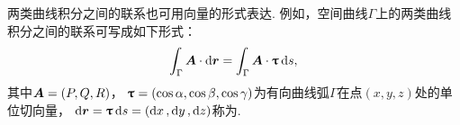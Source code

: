 两类曲线积分之间的联系也可用向量的形式表达.
例如，空间曲线\(\Gamma\)上的两类曲线积分之间的联系可写成如下形式：
\begin{equation}\label{equation:线积分与面积分.空间曲线上两类曲线积分之间的联系的向量形式}
	\int_\Gamma{\boldsymbol{A} \cdot \dd{\boldsymbol{r}}}
	= \int_\Gamma{\boldsymbol{A} \cdot \boldsymbol{\uptau} \dd{s}},
\end{equation}
其中\(\boldsymbol{A}=(P,Q,R)\)，
\(\boldsymbol{\uptau}=(\cos\alpha,\cos\beta,\cos\gamma)\)为有向曲线弧\(\Gamma\)在点\((x,y,z)\)处的单位切向量，
\(\dd{\boldsymbol{r}}
=\boldsymbol{\uptau}\dd{s}
=(\dd{x},\dd{y},\dd{z})\)称为.
